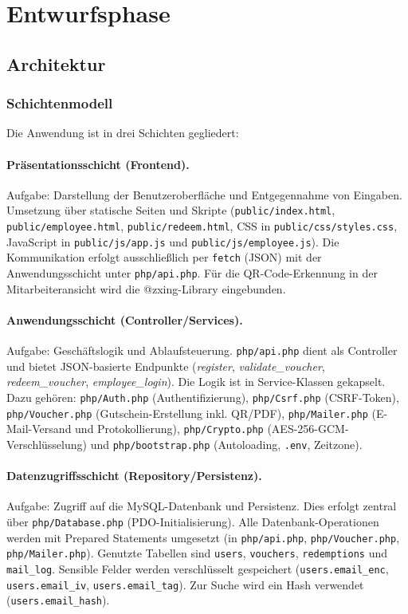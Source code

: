 \section{Entwurfsphase} 
\label{sec:Entwurfsphase}

\subsection{Architektur}

\subsubsection{Schichtenmodell}
Die Anwendung ist in drei Schichten gegliedert:

\paragraph{Präsentationsschicht (Frontend).}
Aufgabe: Darstellung der Benutzeroberfläche und Entgegennahme von Eingaben.  
Umsetzung über statische Seiten und Skripte (\texttt{public/index.html}, \texttt{public/employee.html}, \texttt{public/redeem.html}, CSS in \texttt{public/css/styles.css}, JavaScript in \texttt{public/js/app.js} und \texttt{public/js/employee.js}).  
Die Kommunikation erfolgt ausschließlich per \texttt{fetch} (JSON) mit der Anwendungsschicht unter \texttt{php/api.php}.  
Für die QR-Code-Erkennung in der Mitarbeiteransicht wird die @zxing-Library eingebunden.

\paragraph{Anwendungsschicht (Controller/Services).}
Aufgabe: Geschäftslogik und Ablaufsteuerung.  
\texttt{php/api.php} dient als Controller und bietet JSON-basierte Endpunkte (\zB \textit{register}, \textit{validate\_voucher}, \textit{redeem\_voucher}, \textit{employee\_login}).  
Die Logik ist in Service-Klassen gekapselt. Dazu gehören:  
\texttt{php/Auth.php} (Authentifizierung),  
\texttt{php/Csrf.php} (\ac{CSRF}-Token),  
\texttt{php/Voucher.php} (Gutschein-Erstellung inkl. QR/PDF),  
\texttt{php/Mailer.php} (E-Mail-Versand und Protokollierung),  
\texttt{php/Crypto.php} (\ac{AES}-256-GCM-Verschlüsselung)  
und \texttt{php/bootstrap.php} (Autoloading, \texttt{.env}, Zeitzone).

\paragraph{Datenzugriffsschicht (Repository/Persistenz).}
Aufgabe: Zugriff auf die MySQL-Datenbank und Persistenz.  
Dies erfolgt zentral über \texttt{php/Database.php} (PDO-Initialisierung).  
Alle Datenbank-Operationen werden mit Prepared Statements umgesetzt (\zB in \texttt{php/api.php}, \texttt{php/Voucher.php}, \texttt{php/Mailer.php}).  
Genutzte Tabellen sind \texttt{users}, \texttt{vouchers}, \texttt{redemptions} und \texttt{mail\_log}.  
Sensible Felder werden verschlüsselt gespeichert (\texttt{users.email\_enc}, \texttt{users.email\_iv}, \texttt{users.email\_tag}).  
Zur Suche wird ein Hash verwendet (\texttt{users.email\_hash}).

